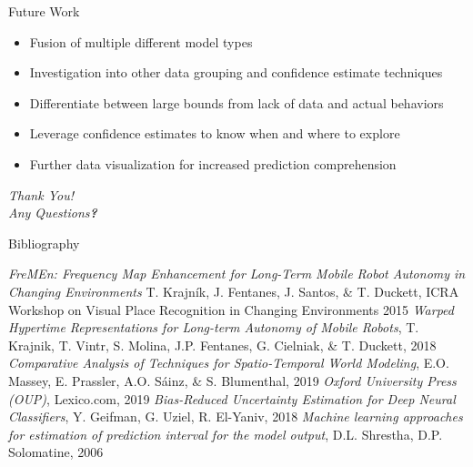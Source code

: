 \documentclass{beamer}
\begin{document}
\begin{frame}[t]{Future Work}

  \begin{itemize}
    \setlength\itemsep{1em}
      \item Fusion of multiple different model types
      \item Investigation into other data grouping and confidence estimate techniques
      \item Differentiate between large bounds from lack of data and actual behaviors
      \item Leverage confidence estimates to know when and where to explore
      \item Further data visualization for increased prediction comprehension

  \end{itemize}

\end{frame}


\begin{frame}

  \centering \huge
  \emph{Thank You!} \\
  \vspace*{1cm}
  \large
  \emph{Any Questions\textbf{?}}

\end{frame}

\begin{frame}[allowframebreaks]{Bibliography}
  \begin{thebibliography}{9}
        \emph{FreMEn: Frequency Map Enhancement for Long-Term Mobile Robot Autonomy in Changing Environments}
        T. Krajník, J. Fentanes, J. Santos, \& T. Duckett,
        ICRA Workshop on Visual Place Recognition in Changing Environments
        2015
        \emph{Warped Hypertime Representations for Long-term Autonomy of Mobile Robots},
        T. Krajnik, T. Vintr, S. Molina, J.P. Fentanes, G. Cielniak, \& T. Duckett,
        2018
        \emph{Comparative Analysis of Techniques for Spatio-Temporal World Modeling},
        E.O. Massey, E. Prassler, A.O. S{\'{a}}inz, \& S. Blumenthal,
        2019
        \emph{Oxford University Press (OUP)},
        Lexico.com,
        2019
        \emph{Bias-Reduced Uncertainty Estimation for Deep Neural Classifiers},
        Y. Geifman, G. Uziel, R. El-Yaniv,
        2018
        \emph{Machine learning approaches for estimation of prediction interval for the model output},
        D.L. Shrestha, D.P. Solomatine,
        2006

  \end{thebibliography}
\end{frame}
\end{document}
